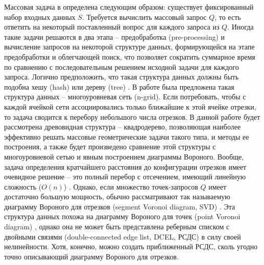 Массовая задача в \cite{PrSh} определена следующим образом: существует
фиксированный набор входных данных $S$. Требуется вычислить массовый
запрос $Q$, то есть ответить на некоторый поставленный вопрос для каждого
запроса из $Q$. Иногда такие задачи решаются в два этапа – предобработка 
(pre-processing) и вычисление запросов на некоторой структуре данных,
формирующейся на этапе предобработки и облегчающей поиск, что позволяет
сократить суммарное время по сравнению с последовательным решением
исходной задачи для каждого запроса.
Логично предположить, что такая структура данных должны быть
подобна хешу (hash) \cite{AHU} или дереву (tree) \cite{QT, SQT, FANN}. В работе \cite{NGRID} была предложена
такая структура данных -- многоуровневая сеть (n-grid). Если потребовать,
чтобы с каждой ячейкой сети ассоциировались только ближайшие к этой
ячейке отрезки, то задача сводится к перебору небольшого числа отрезков. В
данной работе будет рассмотрена древовидная структура -- квадродерево,
позволяющая наиболее эффективно решать массовые геометрические задачи
такого типа, и методы ее построения, а также будет произведено сравнение
этой структуры с многоуровневой сетью и явным построением диаграммы
Вороного.
Вообще, задача определения кратчайшего расстояния до конфигурации
отрезков имеет очевидное решение -- это полный
перебор с отсечением, имеющий линейную сложность ($O(n)$) \cite{DnCG}. Однако, если
множество точек-запросов $Q$ имеет достаточно большую мощность, обычно
рассматривают так называемую диаграмму Вороного для отрезков (segment
Voronoi diagram, SVD) \cite{PrSh, CGAL}. Эта структура данных похожа на диаграмму
Вороного для точек (point Voronoi diagram) \cite{PrSh, CGAL}, однако она не может быть
представлена реберным списком с двойными связями (double-connected edge
list, DCEL, РСДС) \cite{PrSh, CGAL} в силу своей нелинейности. Хотя, конечно, можно
создать приближенный РСДС, сколь угодно точно описывающий диаграмму
Вороного для отрезков.

